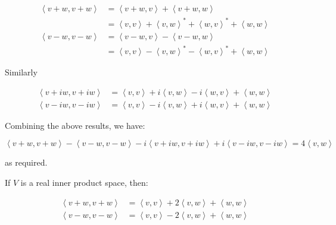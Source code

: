 \documentclass[12pt]{article}
\begin{document}
\begin{equation}
\begin{split}
    \left\langle v + w, v + w \right\rangle &= \left\langle v + w, v \right\rangle + \left\langle v + w, w \right\rangle \\
    &= \left\langle v, v \right\rangle + \left\langle v, w \right\rangle^{*} + \left\langle w, v \right\rangle^{*} + \left\langle w, w \right\rangle \\
    \left\langle v - w, v - w \right\rangle &= \left\langle v - w, v \right\rangle - \left\langle v - w, w \right\rangle \\
    &= \left\langle v, v \right\rangle - \left\langle v, w \right\rangle^{*} - \left\langle w, v \right\rangle^{*} + \left\langle w, w \right\rangle
\end{split}
\end{equation}

Similarly

\begin{equation}
\begin{split}
    \left\langle v + iw, v + iw \right\rangle &= \left\langle v, v \right\rangle + i \left\langle v, w \right\rangle - i \left\langle w, v \right\rangle + \left\langle w, w \right\rangle \\
    \left\langle v - iw, v - iw \right\rangle &= \left\langle v, v \right\rangle - i \left\langle v, w \right\rangle + i \left\langle w, v \right\rangle + \left\langle w, w \right\rangle
\end{split}
\end{equation}

Combining the above results, we have:

\begin{equation}
    \left\langle v + w, v + w \right\rangle - \left\langle v - w, v - w \right\rangle - i \left\langle v + iw, v + iw \right\rangle + i \left\langle v - iw, v - iw \right\rangle = 4 \left\langle v, w \right\rangle
\end{equation}

as required.

If $V$ is a real inner product space, then:

\begin{equation}
\begin{split}
    \left\langle v + w, v + w \right\rangle &= \left\langle v, v \right\rangle + 2\left\langle v, w \right\rangle + \left\langle w, w \right\rangle \\
    \left\langle v - w, v - w \right\rangle &= \left\langle v, v \right\rangle - 2\left\langle v, w \right\rangle + \left\langle w, w \right\rangle
\end{split}
\end{equation}
\end{document}
